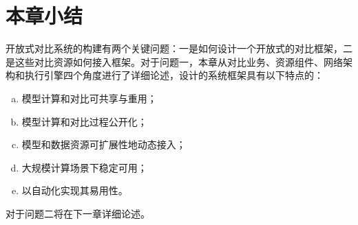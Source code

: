\section{本章小结}
开放式对比系统的构建有两个关键问题：一是如何设计一个开放式的对比框架，二是这些对比资源如何接入框架。对于问题一，本章从对比业务、资源组件、网络架构和执行引擎四个角度进行了详细论述，设计的系统框架具有以下特点的：

\begin{enumerate}[(a)]
    \item 模型计算和对比可共享与重用；
    \item 模型计算和对比过程公开化；
    \item 模型和数据资源可扩展性地动态接入；
    \item 大规模计算场景下稳定可用；
    \item 以自动化实现其易用性。
\end{enumerate} 

对于问题二将在下一章详细论述。